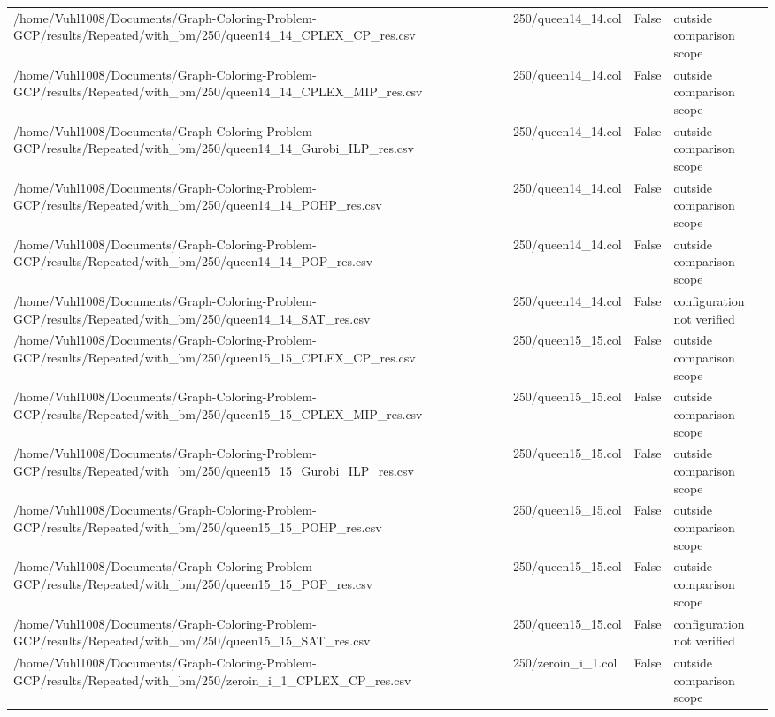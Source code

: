 \begin{table}[htbp]
\begin{tabular}{llll}
/home/Vuhl1008/Documents/Graph-Coloring-Problem-GCP/results/Repeated/with\_bm/250/queen14\_14\_CPLEX\_CP\_res.csv & 250/queen14\_14.col & False & outside comparison scope \\
/home/Vuhl1008/Documents/Graph-Coloring-Problem-GCP/results/Repeated/with\_bm/250/queen14\_14\_CPLEX\_MIP\_res.csv & 250/queen14\_14.col & False & outside comparison scope \\
/home/Vuhl1008/Documents/Graph-Coloring-Problem-GCP/results/Repeated/with\_bm/250/queen14\_14\_Gurobi\_ILP\_res.csv & 250/queen14\_14.col & False & outside comparison scope \\
/home/Vuhl1008/Documents/Graph-Coloring-Problem-GCP/results/Repeated/with\_bm/250/queen14\_14\_POHP\_res.csv & 250/queen14\_14.col & False & outside comparison scope \\
/home/Vuhl1008/Documents/Graph-Coloring-Problem-GCP/results/Repeated/with\_bm/250/queen14\_14\_POP\_res.csv & 250/queen14\_14.col & False & outside comparison scope \\
/home/Vuhl1008/Documents/Graph-Coloring-Problem-GCP/results/Repeated/with\_bm/250/queen14\_14\_SAT\_res.csv & 250/queen14\_14.col & False & configuration not verified \\
/home/Vuhl1008/Documents/Graph-Coloring-Problem-GCP/results/Repeated/with\_bm/250/queen15\_15\_CPLEX\_CP\_res.csv & 250/queen15\_15.col & False & outside comparison scope \\
/home/Vuhl1008/Documents/Graph-Coloring-Problem-GCP/results/Repeated/with\_bm/250/queen15\_15\_CPLEX\_MIP\_res.csv & 250/queen15\_15.col & False & outside comparison scope \\
/home/Vuhl1008/Documents/Graph-Coloring-Problem-GCP/results/Repeated/with\_bm/250/queen15\_15\_Gurobi\_ILP\_res.csv & 250/queen15\_15.col & False & outside comparison scope \\
/home/Vuhl1008/Documents/Graph-Coloring-Problem-GCP/results/Repeated/with\_bm/250/queen15\_15\_POHP\_res.csv & 250/queen15\_15.col & False & outside comparison scope \\
/home/Vuhl1008/Documents/Graph-Coloring-Problem-GCP/results/Repeated/with\_bm/250/queen15\_15\_POP\_res.csv & 250/queen15\_15.col & False & outside comparison scope \\
/home/Vuhl1008/Documents/Graph-Coloring-Problem-GCP/results/Repeated/with\_bm/250/queen15\_15\_SAT\_res.csv & 250/queen15\_15.col & False & configuration not verified \\
/home/Vuhl1008/Documents/Graph-Coloring-Problem-GCP/results/Repeated/with\_bm/250/zeroin\_i\_1\_CPLEX\_CP\_res.csv & 250/zeroin\_i\_1.col & False & outside comparison scope \\

\end{tabular}
\end{table}
